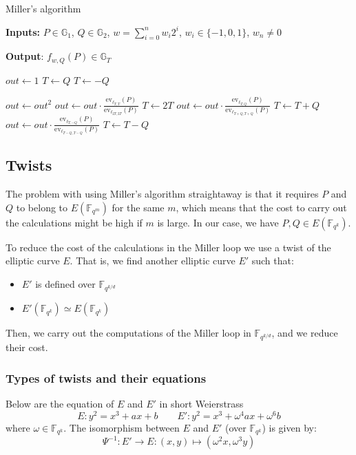 \documentclass{article}
\newcommand{\gOne}{\mathbb{G}_1}
\newcommand{\gTwo}{\mathbb{G}_2}
\newcommand{\gT}{\mathbb{G}_T}
\newcommand{\ev}{\mathrm{ev}}
\newcommand{\fq}[1]{\mathbb{F}_{q^{#1}}}
\theoremstyle{remark}
\theoremstyle{plain}
\begin{document}
\begin{algorithm}
    \caption{\small Miller's algorithm}\label{alg:millerAlgorithm}
    \textbf{Inputs:} $P \in \gOne$, $Q \in \gTwo$, $w = \sum_{i=0}^n w_i 2^i$, $w_i \in \{-1,0,1\}$, $w_n \neq 0$

    \textbf{Output}: $f_{w,Q}(P) \in \gT$
    \begin{algorithmic}
        \State $out \gets 1$
            \State $T \gets Q$
        \Else
            \State $T \gets -Q$
        \EndIf

        \State $out \gets out^2$
        \State $out \gets out \cdot \frac{\ev_{\ell_{T,T}}(P)}{\ev_{\ell_{2T,2T}}(P)}$
        \State $T \gets 2T$
            \State $out \gets out \cdot \frac{\ev_{\ell_{T,Q}}(P)}{\ev_{\ell_{T+Q,T+Q}}(P)}$
            \State $T \gets T + Q$
        \Else
            \State $out \gets out \cdot \frac{\ev_{\ell_{T,-Q}}(P)}{\ev_{\ell_{T-Q,T-Q}}(P)}$
            \State $T \gets T - Q$
        \EndIf
        \EndFor
    \end{algorithmic}
\end{algorithm}

\subsection{Twists}

The problem with using Miller's algorithm straightaway is that it requires $P$ and $Q$ to belong to $E(\fq{m})$ for the same $m$, which means that the cost to carry out the calculations might be high if $m$ is large.
In our case, we have $P, Q \in E(\fq{k})$.

To reduce the cost of the calculations in the Miller loop we use a twist of the elliptic curve $E$.
That is, we find another elliptic curve $E'$ such that:
\begin{itemize}
    \item $E'$ is defined over $\fq{k/d}$
    \item $E'(\fq{k}) \simeq E(\fq{k})$
\end{itemize}
Then, we carry out the computations of the Miller loop in $\fq{k/d}$, and we reduce their cost.

\subsubsection{Types of twists and their equations}
Below are the equation of $E$ and $E'$ in short Weierstrass
\[
    E : y^2 = x^3 + ax + b \quad \quad E': y^2 = x^3 + \omega^4 a x + \omega^6 b
\]
where $\omega \in \fq{k}$.
The isomorphism between $E$ and $E'$ (over $\fq{k}$) is given by:
\[
    \Psi^{-1} \colon E' \rightarrow E: (x,y) \mapsto (\omega^2 x, \omega^3 y)
\]
\end{document}
